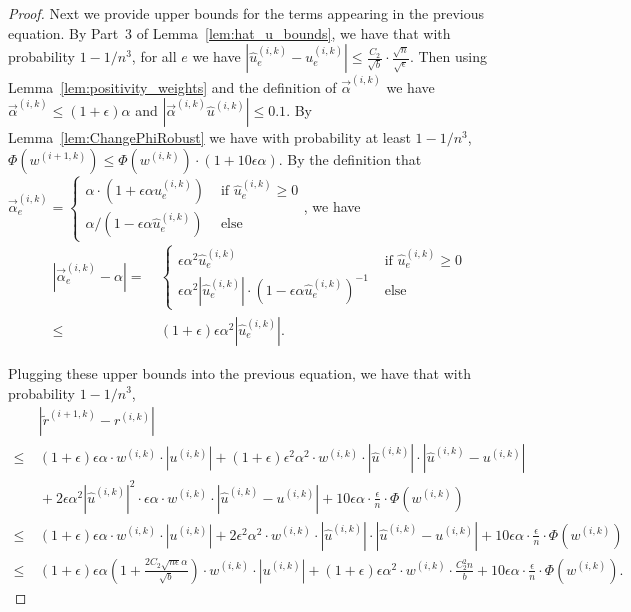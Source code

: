 \documentclass[11pt]{article}
\newcommand\rr{\boldsymbol{\mathit{r}}}
\newcommand\uu{\boldsymbol{\mathit{u}}}
\newcommand\ww{\boldsymbol{\mathit{w}}}
\newcommand{\wh}{\widehat}
\newcommand{\wt}{\widetilde}
\begin{document}
\begin{proof}
Next we provide upper bounds for the terms appearing in the previous equation. By Part~3 of Lemma~\ref{lem:hat_u_bounds}, we have that with probability $1-1/n^3$, for all $e$ we have $|\wh{\uu}^{(i,k)}_e - \uu^{(i,k)}_e| \leq \frac{C_2}{\sqrt{b}} \cdot \frac{\sqrt{n}}{\sqrt{\epsilon}}$. Then using Lemma~\ref{lem:positivity_weights} and the definition of $\overrightarrow{\alpha}^{(i,k)}$ we have $\overrightarrow{\alpha}^{(i,k)} \leq (1 + \epsilon) \alpha$ and $|\overrightarrow{\alpha}^{(i,k)} \wh{\uu}^{(i,k)}| \leq 0.1$. By Lemma~\ref{lem:ChangePhiRobust} we have with probability at least $1-1/n^3$, $\Phi(\ww^{(i+1,k)}) \leq \Phi(\ww^{(i,k)}) \cdot (1 + 10 \epsilon \alpha)$. By the definition that $\overrightarrow{\alpha}^{(i,k)}_e = \begin{cases}
\alpha \cdot (1 + \epsilon\alpha \wh{\uu}^{(i,k)}_e) & \text{ if } \wh{\uu}^{(i,k)}_e \geq 0\\
\alpha / (1 - \epsilon\alpha \wh{\uu}^{(i,k)}_e) & \text{ else }
\end{cases}$, we have 
\begin{align*}
|\overrightarrow{\alpha}^{(i,k)}_e - \alpha| = &~ \begin{cases}
\epsilon \alpha^2 \wh{\uu}^{(i,k)}_e & \text{ if } \wh{\uu}^{(i,k)}_e \geq 0\\
\epsilon \alpha^2 |\wh{\uu}^{(i,k)}_e| \cdot
(1 - \epsilon \alpha \wh{\uu}^{(i,k)}_e)^{-1} & \text{ else }
\end{cases} \\
\leq &~ (1 + \epsilon) \epsilon \alpha^2 |\wh{\uu}^{(i,k)}_e|.
\end{align*}



Plugging these upper bounds into the previous equation, we have that with probability $1 - 1/n^3$,
\begin{align*}
&~ |\wt{\rr}^{(i+1,k)} - \rr^{(i,k)}| \\
\leq &~ (1 + \epsilon) \epsilon \alpha \cdot \ww^{(i,k)} \cdot |\uu^{(i,k)}| + (1 + \epsilon) \epsilon^2 \alpha^2 \cdot \ww^{(i,k)} \cdot |\wh{\uu}^{(i,k)}| \cdot |\wh{\uu}^{(i,k)} - \uu^{(i,k)}| \\ 
&~ + 2 \epsilon \alpha^2 |\wh{\uu}^{(i,k)}|^2 \cdot \epsilon \alpha \cdot \ww^{(i,k)} \cdot |\wh{\uu}^{(i,k)} - \uu^{(i,k)}|  + 10 \epsilon \alpha \cdot \frac{\epsilon}{n} \cdot \Phi(\ww^{(i,k)}) \\
\leq &~ (1 + \epsilon) \epsilon \alpha \cdot \ww^{(i,k)} \cdot |\uu^{(i,k)}| + 2 \epsilon^2 \alpha^2 \cdot \ww^{(i,k)} \cdot |\wh{\uu}^{(i,k)}| \cdot |\wh{\uu}^{(i,k)} - \uu^{(i,k)}| + 10 \epsilon \alpha \cdot \frac{\epsilon}{n} \cdot \Phi(\ww^{(i,k)}) \\ 
\leq &~ (1 + \epsilon) \epsilon \alpha (1 + \frac{2 C_2 \sqrt{n \epsilon} \alpha}{\sqrt{b}}) \cdot \ww^{(i,k)} \cdot |\uu^{(i,k)}| + (1 + \epsilon) \epsilon \alpha^2 \cdot \ww^{(i,k)} \cdot \frac{C_2^2 n}{b} + 10 \epsilon \alpha \cdot \frac{\epsilon}{n} \cdot \Phi(\ww^{(i,k)}).
\end{align*}



\end{proof}
\end{document}
